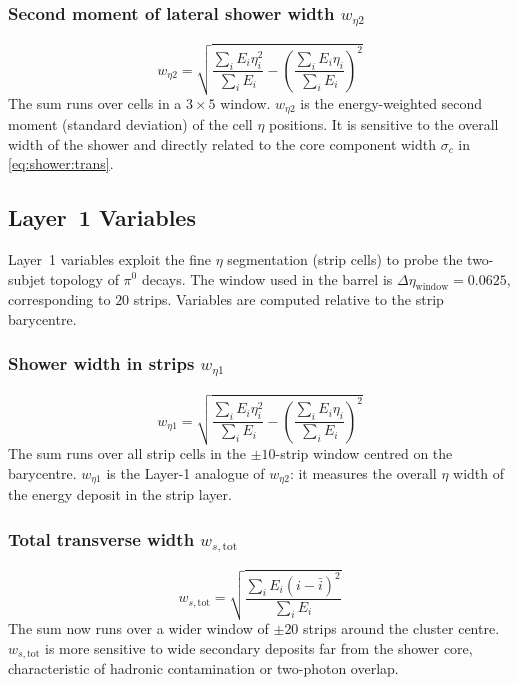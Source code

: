 \documentclass[11pt,a4paper]{article}
\newcommand{\weta}{w_{\eta 2}}
\newcommand{\wetaone}{w_{\eta 1}}
\newcommand{\wstot}{w_{s,\mathrm{tot}}}
\begin{document}
\subsubsection{Second moment of lateral shower width \texorpdfstring{$\weta$}{weta2}}

\begin{equation}
  \weta = \sqrt{\frac{\sum_i E_i \eta_i^2}{\sum_i E_i}
               - \left(\frac{\sum_i E_i \eta_i}{\sum_i E_i}\right)^2}
  \label{eq:weta2}
\end{equation}
The sum runs over cells in a $3\times 5$ window.  $\weta$ is the
energy-weighted second moment (standard deviation) of the cell $\eta$
positions.  It is sensitive to the overall width of the shower and
directly related to the core component width $\sigma_c$ in
\cref{eq:shower:trans}.

\subsection{Layer~1 Variables}
\label{sec:variables:layer1}

Layer~1 variables exploit the fine $\eta$ segmentation (strip cells)
to probe the two-subjet topology of $\pi^0$ decays.  The window used
in the barrel is $\Delta\eta_\mathrm{window} = 0.0625$,
corresponding to $20$ strips.  Variables are computed relative to
the strip barycentre.

\subsubsection{Shower width in strips \texorpdfstring{$\wetaone$}{weta1}}

\begin{equation}
  \wetaone = \sqrt{
    \frac{\sum_i E_i \eta_i^2}{\sum_i E_i}
    - \left(\frac{\sum_i E_i \eta_i}{\sum_i E_i}\right)^2}
  \label{eq:wetaone}
\end{equation}
The sum runs over all strip cells in the $\pm 10$-strip window
centred on the barycentre.  $\wetaone$ is the Layer-1 analogue of
$\weta$: it measures the overall $\eta$ width of the energy deposit
in the strip layer.

\subsubsection{Total transverse width \texorpdfstring{$\wstot$}{wstot}}

\begin{equation}
  \wstot = \sqrt{
    \frac{\sum_i E_i (i - \bar{i})^2}{\sum_i E_i}}
  \label{eq:wstot}
\end{equation}
The sum now runs over a wider window of $\pm 20$ strips around the
cluster centre.  $\wstot$ is more sensitive to wide secondary
deposits far from the shower core, characteristic of hadronic
contamination or two-photon overlap.
\end{document}
